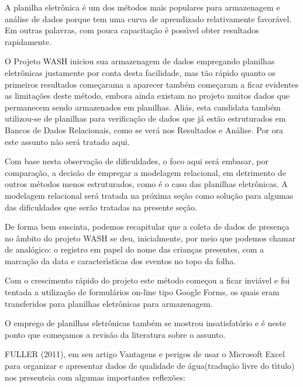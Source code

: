 \documentclass[
12pt,		%
openright,	%
twoside,  %
a4paper,			%
chapter=TITLE,		%
english,			%
french,				%
spanish,			%
brazil				%
]{USPSC-classe/USPSC}
\begin{document}
A planilha eletr\^onica \'e um dos m\'etodos mais populares para armazenagem e an\'alise de dados porque tem uma curva de aprendizado relativamente favor\'avel. Em outras palavras, com pouca capacita\c{c}\~ao \'e poss\'{\i}vel obter resultados rapidamente.


O Projeto WASH iniciou sua armazenagem de dados empregando planilhas eletr\^onicas justamente por conta desta facilidade, mas t\~ao r\'apido quanto os primeiros resultados come\c{c}arama a aparecer tamb\'em come\c{c}aram a ficar evidentes as limita\c{c}\~oes deste m\'etodo, embora ainda existam no projeto muitos dados que permanecem sendo armazenados em planilhas. Ali\'as, esta candidata tamb\'em utilizou-se de planilhas para verifica\c{c}\~ao de dados que j\'a est\~ao estruturados em Bancos de Dados Relacionais, como se ver\'a nos Resultados e An\'alise. Por ora este assunto n\~ao ser\'a tratado aqui.


Com base nesta observa\c{c}\~ao de dificuldades, o foco aqui ser\'a embasar, por compara\c{c}\~ao, a decis\~ao de empregar a modelagem relacional, em detrimento de outros m\'etodos menos estruturados, como \'e o caso das planilhas eletr\^onicas. A modelagem relacional ser\'a tratada na pr\'oxima se\c{c}\~ao como solu\c{c}\~ao para algumas das dificuldades que ser\~ao tratadas na presente se\c{c}\~ao.


De forma bem suscinta, podemos recapitular que a coleta de dados de presen\c{c}a no \^ambito do projeto WASH se deu, inicialmente, por meio que podemos chamar de anal\'ogico: o registro em papel do nome das crian\c{c}as presentes, com a marca\c{c}\~ao da data e caracter\'{\i}sticas dos eventos no topo da folha.


Com o crescimento r\'apido do projeto este m\'etodo come\c{c}ou a ficar invi\'avel e foi tentada a utiliza\c{c}\~ao de formul\'arios on-line tipo \textquotedbl Google Forms\textquotedbl , os quais eram transferidos para planilhas eletr\^onicas para armazenagem.


O emprego de planilhas eletr\^onicas tamb\'em se mostrou insatisfat\'orio e \'e neste ponto que come\c{c}amos a revis\~ao da literatura sobre o assunto.


FULLER (2011), em seu artigo \textquotedbl Vantagens e perigos de usar o Microsoft Excel para organizar e apresentar dados de qualidade de \'agua\textquotedbl  (tradu\c{c}\~ao livre do t\'{\i}tulo) nos presenteia com algumas importantes reflex\~oes:



\noindent\begin{center}\mbox{\centering{}}\end{center}
\end{document}
